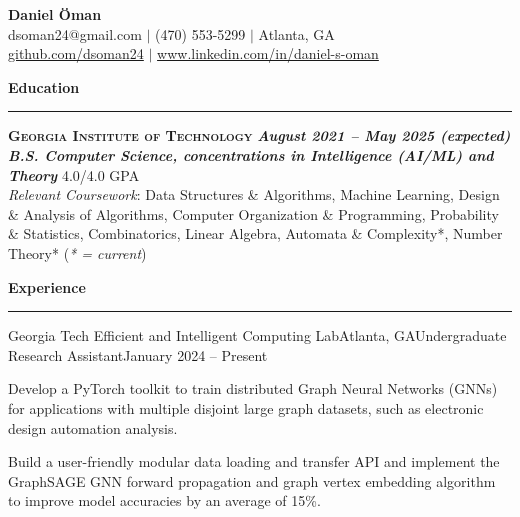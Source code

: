 \documentclass{article}
\newcommand{\horizontal}{\vspace{2pt}\hrule}
\newcommand{\school}[3]{\vspace{2pt}\textsc{\textbf{#1}} \hfill \textbf{\textit{#2}} \\ #3}
\newcommand{\sectitle}[1]{\vspace{3pt} \textbf{\large #1} \horizontal}
\begin{document}
\thispagestyle{empty}
\begin{center}
    \textbf{\LARGE Daniel Öman} \\
    dsoman24@gmail.com $|$ (470) 553-5299 $|$ Atlanta, GA \\
    \href{https://github.com/dsoman24}{github.com/dsoman24} $|$ \href{https://www.linkedin.com/in/daniel-s-oman/}{www.linkedin.com/in/daniel-s-oman}
\end{center}

\begin{flushleft}
\sectitle{Education}

\school{Georgia Institute of Technology}{August 2021 -- May 2025 (expected)}
{\textbf{\textit{B.S. Computer Science, concentrations in Intelligence (AI/ML) and Theory}} \hfill 4.0/4.0 GPA \\ \textit{Relevant Coursework}: Data Structures \& Algorithms, Machine Learning, Design \& Analysis of Algorithms, Computer Organization \& Programming, Probability \& Statistics, Combinatorics, Linear Algebra, Automata \& Complexity*, Number Theory* (\textit{* = current})}

\sectitle{Experience}

    \begin{experience}{Georgia Tech Efficient and Intelligent Computing Lab}{Atlanta, GA}{Undergraduate Research Assistant}{January 2024 -- Present}
        \item Develop a PyTorch toolkit to train distributed Graph Neural Networks (GNNs) for applications with multiple disjoint large graph datasets, such as electronic design automation analysis.
        \item Build a user-friendly modular data loading and transfer API and implement the GraphSAGE GNN forward propagation and graph vertex embedding algorithm to improve model accuracies by an average of 15\%.
    \end{experience}


\end{flushleft}
\end{document}

